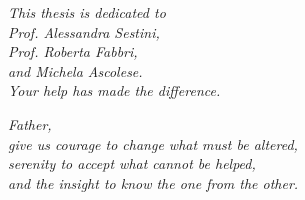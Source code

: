 \thispagestyle{empty}
\null {}
\begin{flushright}
\textit{
This thesis is dedicated to\\
Prof. Alessandra Sestini,\\
Prof. Roberta Fabbri,\\
and Michela Ascolese.\\[1em]
Your help has made the difference.
}
\end{flushright}
\begin{flushright}
\textit{
Father,\\
give us courage to change what must be altered,\\
serenity to accept what cannot be helped,\\
and the insight to know the one from the other.
}
\end{flushright}
 \null
